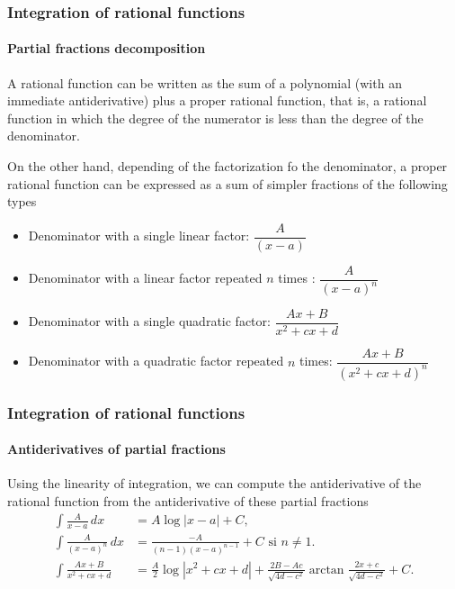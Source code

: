 \begin{frame}
\frametitle{Integration of rational functions}
\framesubtitle{Partial fractions decomposition}
A rational function can be written as the sum of a polynomial (with an immediate antiderivative) plus a proper rational function, that is, a rational function in which the degree of the numerator is less than the degree of the denominator. 

On the other hand, depending of the factorization fo the denominator, a proper rational function can be expressed as a sum of simpler fractions of the following types

\begin{itemize}
\item Denominator with a single linear factor: $\dfrac{A}{(x-a)}$
\item Denominator with a linear factor repeated $n$ times : $\dfrac{A}{(x-a)^{n}}$
\item Denominator with a single quadratic factor: $\dfrac{Ax+B}{x^2+cx+d}$
\item Denominator with a quadratic factor repeated $n$ times: $\dfrac{Ax+B}{(x^2+cx+d)^n}$
\end{itemize}
\end{frame}


\begin{frame}
\frametitle{Integration of rational functions}
\framesubtitle{Antiderivatives of partial fractions}
Using the linearity of integration, we can compute the antiderivative of the rational function from the antiderivative of these partial fractions
\begin{align*}
\int \frac{A}{x-a}\,dx &= A\log|x-a|+C,\\
\int \frac{A}{(x-a)^n}\,dx &= \frac{-A}{(n-1)(x-a)^{n-1}}+C \textrm{ si $n\neq 1$}.\\
\int \frac{Ax+B}{x^2+cx+d} &= \frac{A}{2}\log|x^2+cx+d|+\frac{2B-Ac}{\sqrt{4d-c^2}}\arctan \frac{2x+c}{\sqrt{4d-c^2}}+C.
\end{align*}
\end{frame}


